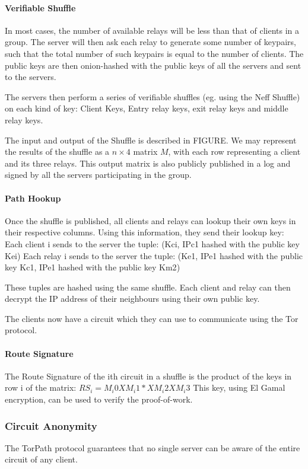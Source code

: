\paragraph{Verifiable Shuffle} 
In most cases, the number of available relays will be less than that of clients 
in a group. The server will then ask each relay to generate some number of 
keypairs, such that the total number of such keypairs is equal to the number of 
clients. The public keys are then onion-hashed with the public keys of all the 
servers and sent to the servers.

The servers then perform a series of verifiable shuffles (eg. using the Neff
Shuffle) on each kind of key: Client Keys, Entry relay keys, exit relay keys and 
middle relay keys.

The input and output of the Shuffle is described in FIGURE. We may represent the
results of the shuffle as a $n \times 4$ matrix $M$, with each row representing 
a client and its three relays. This output matrix is also publicly published in 
a log and signed by all the servers participating in the group.

\paragraph{Path Hookup}
Once the shuffle is published, all clients and relays can lookup their own keys 
in their respective columns. Using this information, they send their lookup key:
Each client i sends to the server the tuple:
(Kci, {IPc1 hashed with the public key Kei})
Each relay i sends to the server the tuple:
(Ke1, {IPe1 hashed with the public key Kc1}, {IPe1 hashed with the public key Km2})

These tuples are hashed using the same shuffle. Each client and relay can then 
decrypt the IP address of their neighbours using their own public key.

The clients now have a circuit which they can use to communicate using the Tor 
protocol.

\paragraph{Route Signature}
The Route Signature of the ith circuit in a shuffle is the product of the keys
in row i of the matrix:
$RS_i = M_i0 X M_i1 * X M_i2 X M_i3$
This key, using El Gamal encryption, can be used to verify the  proof-of-work.

\subsubsection{Circuit Anonymity} 
The TorPath protocol guarantees that no single server can be aware of the entire
circuit of any client. 


